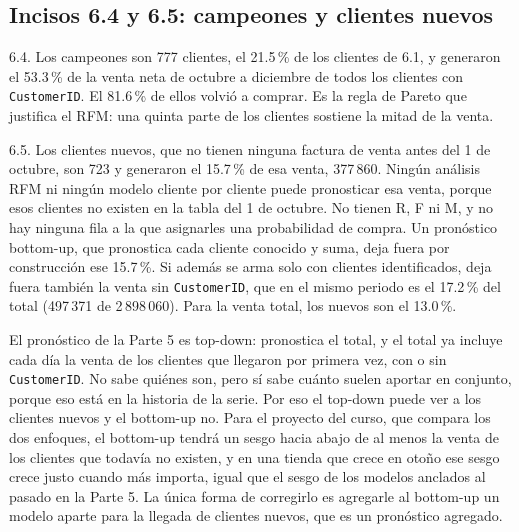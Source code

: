 \documentclass[11pt]{article}
\begin{document}
\subsection*{Incisos 6.4 y 6.5: campeones y clientes nuevos}

\begin{table}[H]
\centering
\caption{Reparto de la venta neta del 1 de octubre al 8 de diciembre entre todos los clientes
con \texttt{CustomerID}, incluidos los nuevos.}\label{tab:reparto}
\end{table}

6.4. Los campeones son 777 clientes, el 21.5\,\% de los clientes de 6.1, y
generaron el 53.3\,\% de la venta neta de octubre a diciembre de todos los clientes con
\texttt{CustomerID}. El 81.6\,\% de ellos volvió a comprar. Es la regla de Pareto que justifica
el RFM: una quinta parte de los clientes sostiene la mitad de la venta.

6.5. Los clientes nuevos, que no tienen ninguna factura de venta antes del 1 de
octubre, son 723 y generaron el 15.7\,\% de esa venta, \textsterling{}377\,860. Ningún análisis
RFM ni ningún modelo cliente por cliente puede pronosticar esa venta, porque esos clientes no
existen en la tabla del 1 de octubre. No tienen R, F ni M, y no hay ninguna fila a la que asignarles
una probabilidad de compra. Un pronóstico bottom-up, que pronostica cada cliente conocido y
suma, deja fuera por construcción ese 15.7\,\%. Si además se arma solo con clientes identificados,
deja fuera también la venta sin \texttt{CustomerID}, que en el mismo periodo es el 17.2\,\% del
total (\textsterling{}497\,371 de \textsterling{}2\,898\,060). Para la venta total, los nuevos son el 13.0\,\%.

El pronóstico de la Parte 5 es top-down: pronostica el total, y el total ya incluye cada día
la venta de los clientes que llegaron por primera vez, con o sin \texttt{CustomerID}. No sabe
quiénes son, pero sí sabe cuánto suelen aportar en conjunto, porque eso está en la historia de la
serie. Por eso el top-down puede ver a los clientes nuevos y el bottom-up no. Para el
proyecto del curso, que compara los dos enfoques, el bottom-up tendrá un sesgo hacia abajo de al
menos la venta de los clientes que todavía no existen, y en una tienda que crece en otoño ese
sesgo crece justo cuando más importa, igual que el sesgo de los modelos anclados al pasado en la
Parte 5. La única forma de corregirlo es agregarle al bottom-up un modelo aparte para la llegada de
clientes nuevos, que es un pronóstico agregado.
\end{document}
